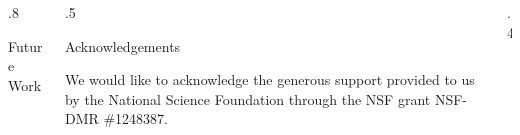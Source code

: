 \documentclass[final]{beamer}
\newlength{\sepwid}
\newlength{\onecolwid}
\begin{document}
\begin{frame}[t]
\begin{block}
\begin{columns}[t]
\begin{column}{.8\onecolwid}
\begin{alertblock}{Future Work}
  \end{alertblock}
\end{column}


\begin{column}{.5\onecolwid}
  \begin{alertblock}{Acknowledgements}

      We would like to acknowledge the generous support provided to us by the National Science
      Foundation through the NSF grant NSF-DMR \#1248387.
      \vspace{8.5ex}
  \end{alertblock}
\end{column}
\begin{column}{.4\onecolwid}\end{column} %
\end{columns} %
\end{block}
\vspace{1ex}


\end{frame} %
\end{document}
